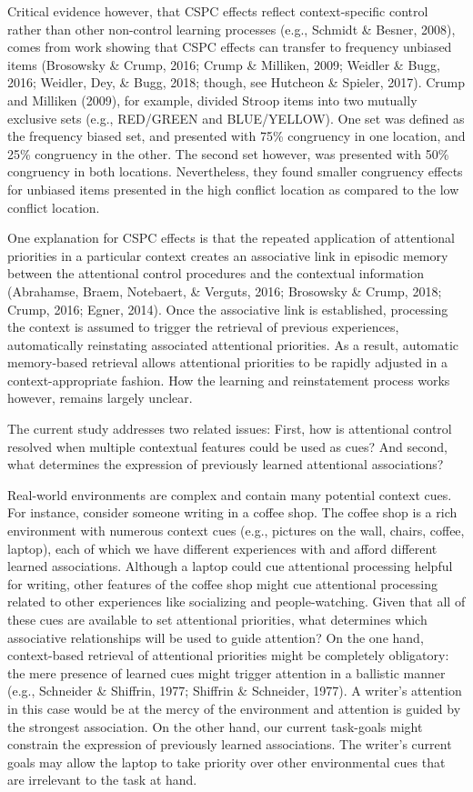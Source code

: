 \documentclass[english,,man,floatsintext]{apa6}
\begin{document}
Critical evidence however, that CSPC effects reflect context-specific control rather than other non-control learning processes (e.g., Schmidt \& Besner, 2008), comes from work showing that CSPC effects can transfer to frequency unbiased items (Brosowsky \& Crump, 2016; Crump \& Milliken, 2009; Weidler \& Bugg, 2016; Weidler, Dey, \& Bugg, 2018; though, see Hutcheon \& Spieler, 2017). Crump and Milliken (2009), for example, divided Stroop items into two mutually exclusive sets (e.g., RED/GREEN and BLUE/YELLOW). One set was defined as the frequency biased set, and presented with 75\% congruency in one location, and 25\% congruency in the other. The second set however, was presented with 50\% congruency in both locations. Nevertheless, they found smaller congruency effects for unbiased items presented in the high conflict location as compared to the low conflict location.

One explanation for CSPC effects is that the repeated application of attentional priorities in a particular context creates an associative link in episodic memory between the attentional control procedures and the contextual information (Abrahamse, Braem, Notebaert, \& Verguts, 2016; Brosowsky \& Crump, 2018; Crump, 2016; Egner, 2014). Once the associative link is established, processing the context is assumed to trigger the retrieval of previous experiences, automatically reinstating associated attentional priorities. As a result, automatic memory-based retrieval allows attentional priorities to be rapidly adjusted in a context-appropriate fashion. How the learning and reinstatement process works however, remains largely unclear.

The current study addresses two related issues: First, how is attentional control resolved when multiple contextual features could be used as cues? And second, what determines the expression of previously learned attentional associations?

Real-world environments are complex and contain many potential context cues. For instance, consider someone writing in a coffee shop. The coffee shop is a rich environment with numerous context cues (e.g., pictures on the wall, chairs, coffee, laptop), each of which we have different experiences with and afford different learned associations. Although a laptop could cue attentional processing helpful for writing, other features of the coffee shop might cue attentional processing related to other experiences like socializing and people-watching. Given that all of these cues are available to set attentional priorities, what determines which associative relationships will be used to guide attention? On the one hand, context-based retrieval of attentional priorities might be completely obligatory: the mere presence of learned cues might trigger attention in a ballistic manner (e.g., Schneider \& Shiffrin, 1977; Shiffrin \& Schneider, 1977). A writer's attention in this case would be at the mercy of the environment and attention is guided by the strongest association. On the other hand, our current task-goals might constrain the expression of previously learned associations. The writer's current goals may allow the laptop to take priority over other environmental cues that are irrelevant to the task at hand.
\end{document}
